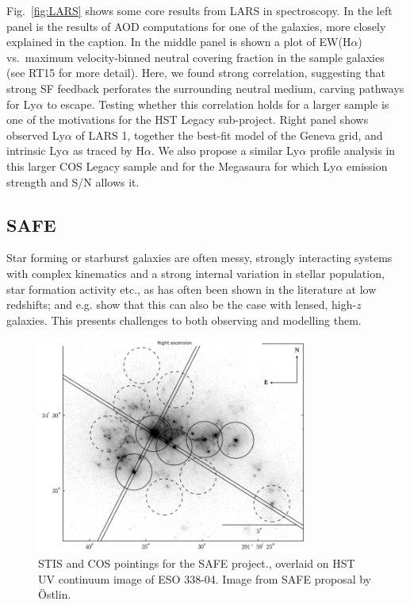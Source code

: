 \documentclass[12pt]{amsart}
\begin{document}
Fig.~\ref{fig:LARS} shows some core results from LARS in spectroscopy. In the
left panel is the results of AOD computations for one of the galaxies, more
closely explained in the caption. In the middle panel is shown a plot of
EW(H$\alpha$) vs.\ maximum velocity-binned neutral covering fraction in the sample
galaxies (see RT15 for more detail). Here, we found strong correlation,
suggesting that strong SF feedback perforates the surrounding neutral medium,
carving pathways for Ly$\alpha$ to escape. Testing whether this correlation
holds for a larger sample is one of the motivations for the HST Legacy
sub-project. Right panel shows observed Ly$\alpha$ of LARS 1, together the
best-fit model of the Geneva grid, and intrinsic Ly$\alpha$ as traced by
H$\alpha$.  We also propose a similar Ly$\alpha$ profile analysis in this larger
COS Legacy sample and for the Megasaura for which Ly$\alpha$ emission strength
and S/N allows it. 


\subsection{SAFE}

Star forming or starburst galaxies are often messy, strongly interacting systems
with complex kinematics and a strong internal variation in stellar population,
star formation activity etc., as has often been shown in the literature at  low
redshifts; and e.g. \cite{Bayliss2014} show that this can also be the case with
lensed, high-$z$ galaxies. This presents challenges to both observing and
modelling them. 

\begin{figure}[htbp] %
   \centering
   \includegraphics[width=3.5in]{SAFEpointings.png} 
   \caption{STIS and COS pointings for the SAFE project., overlaid on HST UV
   continuum image of ESO 338-04. Image from SAFE proposal by Östlin.}
   \label{fig:example}
\end{figure}
\end{document}
